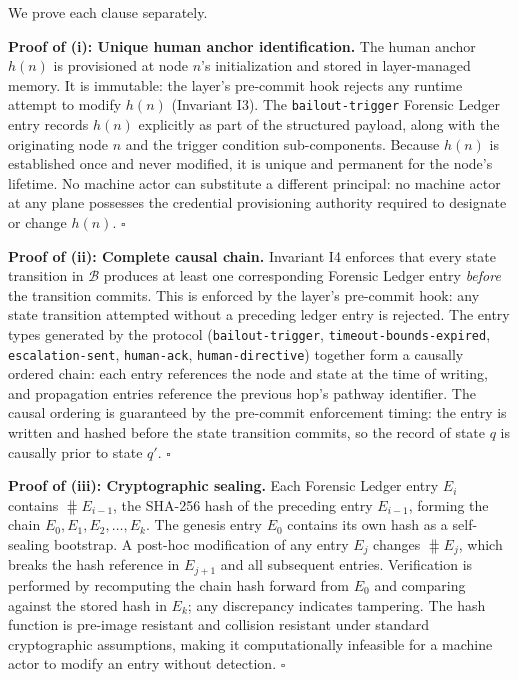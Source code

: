 \begin{Proof}
We prove each clause separately.

\medskip
\noindent\textbf{Proof of (i): Unique human anchor identification.}
The human anchor $h(n)$ is provisioned at node $n$'s initialization and stored
in \fact{} layer-managed memory.  It is immutable: the \fact{} layer's
pre-commit hook rejects any runtime attempt to modify $h(n)$ (Invariant I3).
The \texttt{bailout-trigger} Forensic Ledger entry records $h(n)$ explicitly as
part of the structured payload, along with the originating node $n$ and the
trigger condition sub-components.  Because $h(n)$ is established once and never
modified, it is unique and permanent for the node's lifetime.  No machine actor
can substitute a different principal: no machine actor at any plane possesses
the credential provisioning authority required to designate or change $h(n)$.
$\square$

\medskip
\noindent\textbf{Proof of (ii): Complete causal chain.}
Invariant I4 enforces that every state transition in $\mathcal{B}$ produces at
least one corresponding Forensic Ledger entry \emph{before} the transition
commits.  This is enforced by the \fact{} layer's pre-commit hook: any state
transition attempted without a preceding ledger entry is rejected.  The entry
types generated by the protocol (\texttt{bailout-trigger},
\texttt{timeout-bounds-expired}, \texttt{escalation-sent}, \texttt{human-ack},
\texttt{human-directive}) together form a causally ordered chain: each entry
references the node and state at the time of writing, and propagation entries
reference the previous hop's pathway identifier.  The causal ordering is
guaranteed by the pre-commit enforcement timing: the entry is written and
hashed before the state transition commits, so the record of state $q$ is
causally prior to state $q'$.  $\square$

\medskip
\noindent\textbf{Proof of (iii): Cryptographic sealing.}
Each Forensic Ledger entry $E_i$ contains $\hash{E_{i-1}}$, the SHA-256 hash of
the preceding entry $E_{i-1}$, forming the chain
$E_0, E_1, E_2, \ldots, E_k$.  The genesis entry $E_0$ contains its own hash as
a self-sealing bootstrap.  A post-hoc modification of any entry $E_j$ changes
$\hash{E_j}$, which breaks the hash reference in $E_{j+1}$ and all subsequent
entries.  Verification is performed by recomputing the chain hash forward from
$E_0$ and comparing against the stored hash in $E_k$; any discrepancy indicates
tampering.  The hash function is pre-image resistant and collision resistant
under standard cryptographic assumptions, making it computationally infeasible
for a machine actor to modify an entry without detection.  $\square$
\end{Proof}

